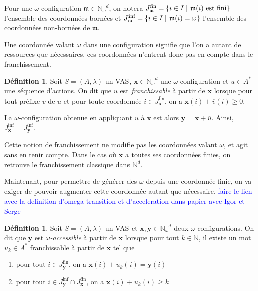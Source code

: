 \documentclass[a4paper,final]{article}
\theoremstyle{definition}
\newtheorem{Definition}[Theorem]{Définition}
\let\geq\geqslant
\newcommand{\alain}[1]{\textcolor{blue}{#1}}
\newcommand{\set}[2]{\left\{#1\mathrel{\left|\vphantom{#1}\vphantom{#2}\right.}#2\right\}}
\let\inter\cap
\newcommand{\N}{\ensuremath{\mathbb{N}}}
\newcommand{\Nomega}{\ensuremath{\mathbb{N}_\omega}}
\newcommand{\vect}[1]{\ensuremath{\mathbf{#1}}}
\newcommand{\valeur}[1]{\ensuremath{\overline{#1}}}
\newcommand{\Jfin}[1]{J^\text{fin}_{#1}}
\newcommand{\Jinf}[1]{J^\text{inf}_{#1}}
\begin{document}
Pour une $\omega$-configuration $\mathfrak{m} \in \Nomega^d$, on notera $\Jfin{\mathfrak{m}} = \set{i\in I}{\mathfrak{m}(i) \text{ est fini}}$ l'ensemble des coordonnées bornées et  $\Jinf{\mathfrak{m}} = \set{i\in I}{\mathfrak{m}(i)=\omega}$ l'ensemble des coordonnées non-bornées de $\mathfrak{m}$.

Une coordonnée valant $\omega$ dans une configuration signifie que l'on a autant de ressources que nécessaires.
ces coordonnées n'entrent donc pas en compte dans le franchissement.

\begin{Definition}
Soit $S = (A,\lambda)$ un VAS, $\vect{x} \in \Nomega^d$ une $\omega$-configuration et $u \in A^*$ une séquence d'actions.
On dit que $u$ est \emph{franchissable} à partir de $\vect{x}$ lorsque pour tout préfixe $v$ de $u$ et pour toute coordonnée $i \in \Jfin{\vect{x}}$, on a $\vect{x}(i) + \valeur{v}(i) \geq 0$.

La $\omega$-configuration obtenue en appliquant $u$ à $\vect{x}$ est alors $\vect{y} = \vect{x} + \valeur{u}$.
Ainsi, $\Jinf{\vect{x}} = \Jinf{\vect{y}}$.
\end{Definition}

Cette notion de franchissement ne modifie pas les coordonnées valant $\omega$, et agit sans en tenir compte.
Dans le cas où $\vect{x}$ a toutes ses coordonnées finies, on retrouve le franchissement classique dans $\N^d$.

Maintenant, pour permettre de générer des $\omega$ depuis une coordonnée finie, on va exiger de pouvoir augmenter cette coordonnée autant que nécessaire.
\alain{faire le lien avec la definition d'omega transition et d'acceleration dans papier avec Igor et Serge}

\begin{Definition}
Soit $S = (A,\lambda)$ un VAS et $\vect{x},\vect{y} \in \Nomega^d$ deux $\omega$-configurations.
On dit que $\vect{y}$ est \emph{$\omega$-accessible} à partir de $\vect{x}$ lorsque pour tout $k\in\N$, il existe un mot $u_k \in A^*$ franchissable à partir de $\vect{x}$ tel que 
\begin{enumerate}
    \item pour tout $i\in\Jfin{\vect{y}}$, on a $\vect{x}(i) + \valeur{u_k}(i) = \vect{y}(i)$
    \item pour tout $i\in \Jinf{\vect{y}} \inter \Jfin{\vect{x}}$, on a $\vect{x}(i) + \valeur{u_k}(i) \geq k$
\end{enumerate}
\end{Definition}
\end{document}
